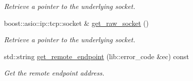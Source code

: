 \begin{DoxyCompactItemize}
\begin{DoxyCompactList}\small\item\em Retrieve a pointer to the underlying socket. \end{DoxyCompactList}\item 
boost\+::asio\+::ip\+::tcp\+::socket \& \hyperlink{classwebsocketpp_1_1transport_1_1asio_1_1basic__socket_1_1connection_ae78411976891751bd7f3d11ab26e0e7e}{get\+\_\+raw\+\_\+socket} ()
\begin{DoxyCompactList}\small\item\em Retrieve a pointer to the underlying socket. \end{DoxyCompactList}\item 
std\+::string \hyperlink{classwebsocketpp_1_1transport_1_1asio_1_1basic__socket_1_1connection_ab8e022cc8ebabf59c2884f6525729892}{get\+\_\+remote\+\_\+endpoint} (lib\+::error\+\_\+code \&ec) const
\begin{DoxyCompactList}\small\item\em Get the remote endpoint address. \end{DoxyCompactList}\end{DoxyCompactItemize}
